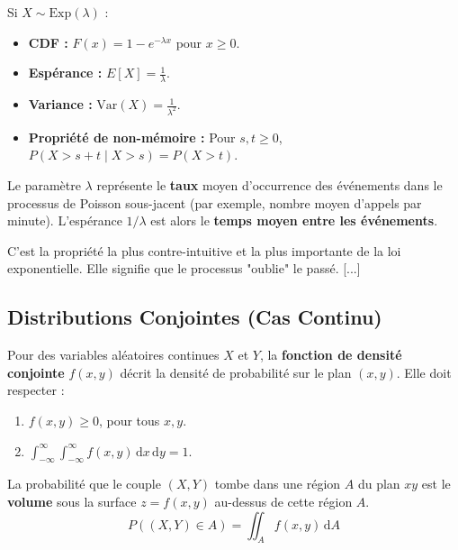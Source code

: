 \begin{theorembox}
Si $X \sim \text{Exp}(\lambda)$ :
\begin{itemize}
    \item \textbf{CDF :} $F(x) = 1 - e^{-\lambda x}$ pour $x \ge 0$.
    \item \textbf{Espérance :} $E[X] = \frac{1}{\lambda}$.
    \item \textbf{Variance :} $\text{Var}(X) = \frac{1}{\lambda^2}$.
    \item \textbf{Propriété de non-mémoire :} Pour $s, t \ge 0$, $P(X > s+t \mid X > s) = P(X > t)$.
\end{itemize}
\end{theorembox}

\begin{remarquebox}
Le paramètre $\lambda$ représente le \textbf{taux} moyen d'occurrence des événements dans le processus de Poisson sous-jacent (par exemple, nombre moyen d'appels par minute). L'espérance $1/\lambda$ est alors le \textbf{temps moyen entre les événements}.
\end{remarquebox}

\begin{intuitionbox}
C'est la propriété la plus contre-intuitive et la plus importante de la loi exponentielle. Elle signifie que le processus "oublie" le passé. [...]
\end{intuitionbox}

\subsection{Distributions Conjointes (Cas Continu)}

\begin{definitionbox}
Pour des variables aléatoires continues $X$ et $Y$, la \textbf{fonction de densité conjointe} $f(x, y)$ décrit la densité de probabilité sur le plan $(x, y)$. Elle doit respecter :
\begin{enumerate}
    \item $f(x, y) \ge 0$, pour tous $x, y$.
    \item $\int_{-\infty}^{\infty} \int_{-\infty}^{\infty} f(x, y) \, \mathrm{d}x \, \mathrm{d}y = 1$.
\end{enumerate}
\end{definitionbox}

\begin{intuitionbox}[Volume = Probabilité]
La probabilité que le couple $(X, Y)$ tombe dans une région $A$ du plan $xy$ est le \textbf{volume} sous la surface $z=f(x,y)$ au-dessus de cette région $A$.
$$ P((X, Y) \in A) = \iint_A f(x, y) \, \mathrm{d}A $$

\end{intuitionbox}

